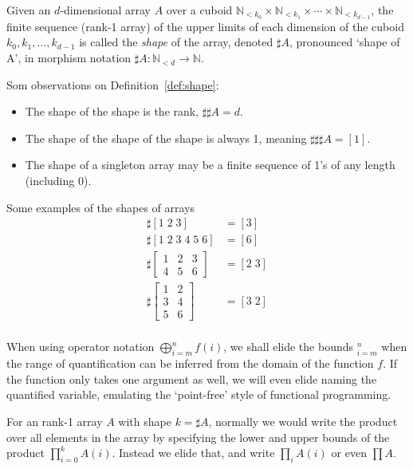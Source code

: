\documentclass{DIKU-report-variant}
\newcommand\Nat{\mathbb{N}}
\begin{document}
\begin{definition}
  \label{def:shape}
  Given an \(d\)-dimensional array \(A\) over a cuboid
  \(\Nat_{<k_0} \times \Nat_{<k_1} \times \cdots \times \Nat_{<k_{d-1}}\),
  the finite sequence (rank-1 array) of the upper limits of each dimension of the cuboid
  \(k_0, k_1, \dots, k_{d-1}\) is called the \emph{shape} of the array, denoted
  \(\sharp A\), pronounced `shape of A', in morphism notation \(\sharp A : \Nat_{<d} \to \Nat\). 
\end{definition}
\begin{observation}
  \label{ob:shape}
  Som observations on Definition~\ref{def:shape}:
  \begin{itemize}
    \item The shape of the shape is the rank, \(\sharp \sharp A = d\).
    \item The shape of the shape of the shape is always 1, meaning \(\sharp \sharp \sharp A = [1]\).
    \item The shape of a singleton array may be a finite sequence of 1's of any length (including 0).
  \end{itemize}
\end{observation}

\begin{example}
  Some examples of the shapes of arrays
  \begin{align*}
    \sharp [1\; 2\; 3] &= [3] \\
    \sharp [1\; 2\; 3\; 4\; 5\; 6] &= [6] \\
    \sharp \begin{bmatrix}
      1 & 2 & 3 \\ 4 & 5 & 6
    \end{bmatrix} &= [2\; 3] \\
    \sharp \begin{bmatrix}
      1 & 2 \\ 3 & 4 \\ 5 & 6
    \end{bmatrix} &= [3\; 2] \\
  \end{align*}
\end{example}

\begin{remark}
  \label{rem:quant-elision}
  When using operator notation \(\bigoplus_{i=m}^n f(i)\),
  we shall elide the bounds \({}_{i=m}^n\) when the range of quantification can
  be inferred from the domain of the function \(f\). If the function only
  takes one argument as well, we will even elide naming the quantified variable,
  emulating the `point-free' style of functional programming.

  For an rank-1 array \(A\) with shape \(k = \sharp A\), normally we would
  write the product over all elements in the array by specifying the lower
  and upper bounds of the product \(\prod_{i=0}^{k} A(i)\). Instead we elide
  that, and write \(\prod_i A(i)\) or even \(\prod A\).
\end{remark}
\end{document}

